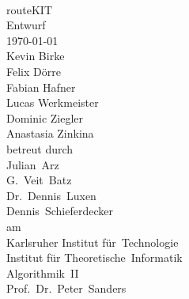 \documentclass[a4paper, 11pt]{article}
\begin{document}

\newcommand{\refsymbol}[0]{\scalebox{0.5}{$\nearrow$}}
\let\oldref\ref
\renewcommand{\ref}[1]{\refsymbol\oldref{#1}}
\let\oldgls\gls
\renewcommand{\gls}[1]{\refsymbol\oldgls{#1}}
\let\oldGls\Gls
\renewcommand{\Gls}[1]{\refsymbol\oldGls{#1}}
\let\oldglspl\glspl
\renewcommand{\glspl}[1]{\refsymbol\oldglspl{#1}}
\let\oldGlspl\Glspl
\renewcommand{\Glspl}[1]{\refsymbol\oldGlspl{#1}}
\let\oldglslink\glslink
\renewcommand{\glslink}[2]{\refsymbol\oldglslink{#1}{#2}}
\let\oldhyperref\hyperref
\renewcommand{\hyperref}[2][notActuallyOptional]{\refsymbol\oldhyperref[#1]{#2}}
\let\oldautoref\autoref
\renewcommand{\autoref}[1]{\refsymbol\oldautoref{#1}}

\newcommand{\abbildung}[1]{\autoref{fig:#1}}
\newcommand{\routeKIT}[0]{\textit{routeKIT} }

\begin{titlepage}
\makeatletter
\begin{center}
~\\[5em]
{\Huge routeKIT}\\[3em]
{\huge Entwurf}\\[1em]
{\large\today}\\[2.5em]
{\LARGE
Kevin Birke\\
Felix Dörre\\
Fabian Hafner\\
Lucas Werkmeister\\
Dominic Ziegler\\
Anastasia Zinkina\\[3em]}
betreut durch\\[2em]
{\Large
Julian~Arz\\
G.~Veit~Batz\\
Dr.~Dennis~Luxen\\
Dennis~Schieferdecker\\[1em]}
am\\[1em]
{\Large
Karlsruher Institut für~Technologie\\
Institut für Theoretische~Informatik\\
Algorithmik~II\\
\large
Prof.~Dr.~Peter~Sanders}
\end{center}
\makeatother
\end{titlepage}
\tableofcontents
\newpage
\end{document}
